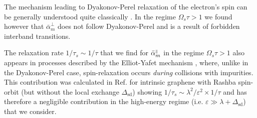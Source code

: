 

The mechanism leading to Dyakonov-Perel relaxation of the electron's spin can be generally understood quite classically \cite{dyakonov_spintronics_2004}. In the regime $\Omega_s \tau > 1$ we found however that $\bar{\alpha}_m^{\perp}$ does not follow Dyakonov-Perel and is a result of forbidden interband transitions. 

The relaxation rate $1/\tau_s\sim 1/\tau$ that we find for $\bar{\alpha}_m^{{\scriptscriptstyle\parallel}}$ in the regime $\Omega_s \tau > 1$ also appears in processes described by the Elliot-Yafet mechanism \cite{elliott_theory_1954, yafet_g_1963}, where, unlike in the Dyakonov-Perel case, spin-relaxation occurs \emph{during} collisions with impurities. This contribution was calculated in Ref. \cite{huertas-hernando_spin-orbit-mediated_2009} for intrinsic graphene with Rashba spin-orbit (but without the local exchange $\Delta_\text{sd}$) showing $1/\tau_s \sim \lambda^2/\varepsilon^2 \times 1/\tau $ and has therefore a negligible contribution in the high-energy regime (i.e. $\varepsilon \gg \lambda + \Delta_\text{sd}$) that we consider.


